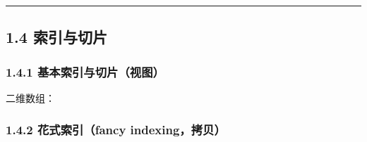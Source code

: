 \begin{center}\rule{0.5\linewidth}{0.5pt}\end{center}

\subsection{1.4 索引与切片}\label{ux7d22ux5f15ux4e0eux5207ux7247}

\subsubsection{1.4.1
基本索引与切片（视图）}\label{ux57faux672cux7d22ux5f15ux4e0eux5207ux7247ux89c6ux56fe}

\begin{Shaded}
\begin{Highlighting}[]
\OperatorTok{=}\NormalTok{)}
\NormalTok{a[}\NormalTok{]        }
\NormalTok{a[}\NormalTok{:}\NormalTok{]      }
\NormalTok{a[::}\OperatorTok{{-}}\NormalTok{]     }
\end{Highlighting}
\end{Shaded}

二维数组：

\begin{Shaded}
\begin{Highlighting}[]
\OperatorTok{=}\NormalTok{, }\NormalTok{)}
\NormalTok{m[}\NormalTok{, }\NormalTok{]      }
\NormalTok{m[:, }\NormalTok{]      }
\NormalTok{m[}\NormalTok{:}\NormalTok{, }\NormalTok{:}\NormalTok{]  }
\end{Highlighting}
\end{Shaded}

\subsubsection{1.4.2 花式索引（fancy
indexing，拷贝）}\label{ux82b1ux5f0fux7d22ux5f15fancy-indexingux62f7ux8d1d}

\begin{Shaded}
\begin{Highlighting}[]
\OperatorTok{=}\NormalTok{, }\NormalTok{)}
\NormalTok{(m[[}\NormalTok{, }\NormalTok{], [}\NormalTok{, }\NormalTok{]])     }
\NormalTok{(m[np.ix\_([}\NormalTok{, }\NormalTok{], [}\NormalTok{, }\NormalTok{])])  }
\end{Highlighting}
\end{Shaded}


